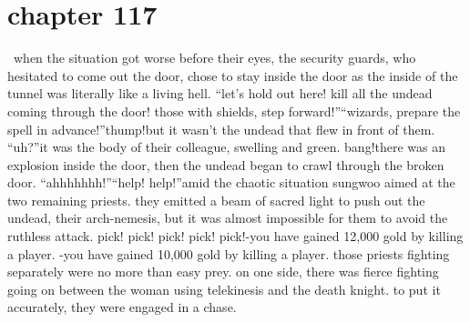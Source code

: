 \section{chapter 117}






 when the situation got worse before their eyes, the security guards, who hesitated to come out the door, chose to stay inside the door as the inside of the tunnel was literally like a living hell.
“let’s hold out here! kill all the undead coming through the door! those with shields, step forward!”“wizards, prepare the spell in advance!”thump!but it wasn’t the undead that flew in front of them.
“uh?”it was the body of their colleague, swelling and green.
bang!there was an explosion inside the door, then the undead began to crawl through the broken door.
“ahhhhhhh!”“help! help!”amid the chaotic situation sungwoo aimed at the two remaining priests.
 they emitted a beam of sacred light to push out the undead, their arch-nemesis, but it was almost impossible for them to avoid the ruthless attack.
pick! pick! pick! pick! pick!-you have gained 12,000 gold by killing a player.
-you have gained 10,000 gold by killing a player.
those priests fighting separately were no more than easy prey.
on one side, there was fierce fighting going on between the woman using telekinesis and the death knight.
 to put it accurately, they were engaged in a chase.

